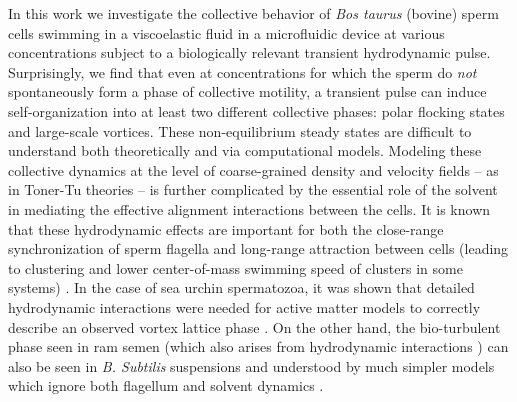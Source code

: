 \documentclass[reprint,unsortedaddress,amsmath,amssymb,aps,pre]{revtex4-2}
\begin{document}
In this work we investigate the collective behavior of \textit{Bos taurus} (bovine) sperm cells swimming in a viscoelastic fluid in a microfluidic device at various concentrations subject to a biologically relevant transient hydrodynamic pulse. Surprisingly, we find that even at concentrations for which the sperm do \emph{not} spontaneously form a phase of collective motility, a transient pulse can induce self-organization into at least two different collective phases: polar flocking states and large-scale vortices. These non-equilibrium steady states are difficult to understand both theoretically and via computational models. Modeling these collective dynamics at the level of coarse-grained density and velocity fields -- as in Toner-Tu theories -- is further complicated by the essential role of the solvent in mediating the effective alignment interactions between the cells. It is known that these hydrodynamic effects are important for both the close-range synchronization of sperm flagella and long-range attraction between cells (leading to clustering and lower center-of-mass swimming speed of clusters in some systems) \cite{yang2008cooperation}. In the case of sea urchin spermatozoa, it was shown that detailed hydrodynamic interactions were needed for active matter models to correctly describe an observed vortex lattice phase \cite{yang2014self}. On the other hand, the bio-turbulent phase seen in ram semen \cite{creppy2015turbulence} (which also arises from hydrodynamic interactions \cite{2009_Sokolov, 2015_Lopez}) can also be seen in \textit{B. Subtilis} suspensions and understood by much simpler models which ignore both flagellum and solvent dynamics \cite{2012_Wensink, 2014_GroBmann}.
\end{document}
